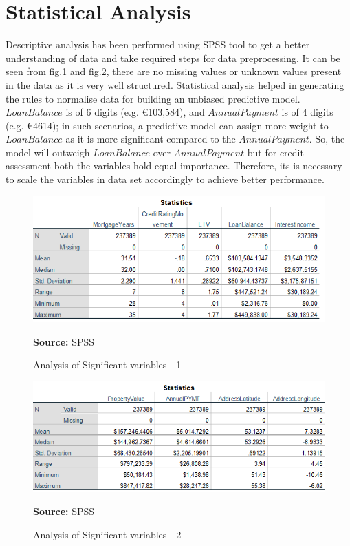 \section{Statistical Analysis}

Descriptive analysis has been performed using SPSS tool to get a better understanding of data and take required steps for data preprocessing. It can be seen from fig.\ref{fig:stats1} and fig.\ref{fig:stats2}, there are no missing values or unknown values present in the data as it is very well structured. Statistical analysis helped in generating the rules to normalise data for building an unbiased predictive model. $Loan Balance$ is of 6 digits (e.g. \euro103,584), and $Annual Payment$ is of 4 digits (e.g. \euro4614); in such scenarios, a predictive model can assign more weight to $Loan Balance$ as it is more significant compared to the $Annual Payment$. So, the model will outweigh $Loan Balance$ over $Annual Payment$ but for credit assessment both the variables hold equal importance. Therefore, its is necessary to scale the variables in data set accordingly to achieve better performance.  

\begin{center}
\begin{figure}[!htb]
\includegraphics[scale=0.7]{stats1.png}
\centering
\caption{Analysis of Significant variables - 1}{\textbf{Source:} SPSS}
\label{fig:stats1}
\end{figure}
\end{center}


\begin{center}
\begin{figure}[!htb]
\includegraphics[scale=0.7]{stats2.png}
\centering
\caption{Analysis of Significant variables - 2}{\textbf{Source:} SPSS}
\label{fig:stats2}
\end{figure}
\end{center}



